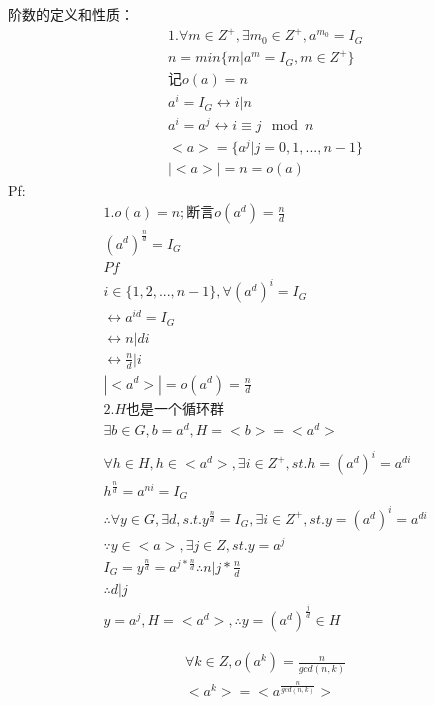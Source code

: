 \documentclass[12pt, a4paper]{article}  %
\begin{document}
阶数的定义和性质：
\begin{align}
    &1.\forall m\in Z^{+},\exists m_0\in Z^{+},a^{m_0}=I_G\\
    &n=min\{m|a^m=I_G,m\in Z^{+}\}\\
    &\text{记} o(a)=n\\
    & a^i=I_G\leftrightarrow i|n\\
    & a^i=a^j\leftrightarrow i\equiv j \mod n\\
    &<a>=\{a^j|j=0,1,...,n-1\}\\
    &|<a>|=n=o(a)
\end{align}
Pf:
\begin{align}
    &1. o(a)=n;\text{断言} o(a^d)=\frac{n}{d}\\
    & (a^d)^{\frac{n}{d}}=I_G\\
    &Pf\\
    &i\in \{1,2,...,n-1\},\forall (a^d)^i=I_G\\
    & \leftrightarrow a^{id}=I_G\\
    &\leftrightarrow n|di\\
    &\leftrightarrow \frac{n}{d}|i\\
    &|<a^d>|=o(a^d)=\frac{n}{d}\\
    &2.H\text{也是一个循环群}\\
    & \exists b\in G,b=a^d,H=<b>=<a^d>\\
    &\\
    &\forall h\in H,h\in<a^d>,\exists i\in Z^{+},st. h=(a^d)^i=a^{di}\\
    &h^{\frac{n}{d}}=a^{ni}=I_G\\
    &\therefore \forall y\in G,\exists d,s.t. y^{\frac{n}{d}}=I_G,\exists i\in Z^{+},st. y=(a^d)^i=a^{di}\\
    &\because y\in <a>,\exists j\in Z,st. y=a^j\\
    & I_G=y^{\frac{n}{d}}=a^{j*\frac{n}{d}}\therefore n|j*\frac{n}{d}\\
    &\therefore d|j\\
    &y=a^j,H=<a^d>,\therefore y=(a^d)^\frac{j}{d}\in H
\end{align}

\begin{align}
    &\forall k\in Z,o(a^k)=\frac{n}{gcd(n,k)}\\
    &<a^k>=<a^{\frac{n}{gcd(n,k)}}>
\end{align}
\end{document}

